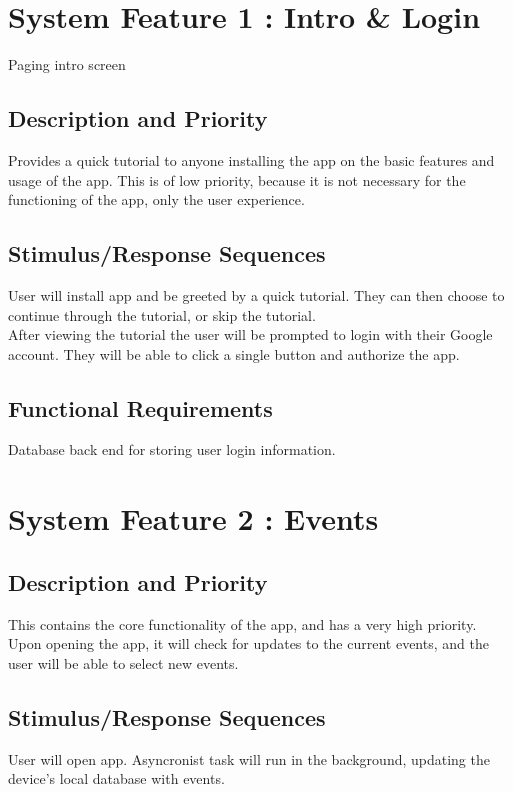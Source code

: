 \documentclass{scrreprt}
\begin{document}
\section{System Feature 1 : Intro \& Login}
Paging intro screen

\subsection{Description and Priority}
Provides a quick tutorial to anyone installing the app on the basic features and 
usage of the app. This is of low priority, because it is not necessary for the functioning 
of the app, only the user experience.

\subsection{Stimulus/Response Sequences}
User will install app and be greeted by a quick tutorial. They can then choose to 
continue through the tutorial, or skip the tutorial. \\
After viewing the tutorial the user will be prompted to login with their Google account.
They will be able to click a single button and authorize the app.

\subsection{Functional Requirements}
Database back end for storing user login information.

\section{System Feature 2 : Events}

\subsection{Description and Priority}
This contains the core functionality of the app, and has a very high priority. Upon opening 
the app, it will check for updates to the current events, and the user will be able to 
select new events.

\subsection{Stimulus/Response Sequences}
User will open app. Asyncronist task will run in the background, updating the device's
local database with events.
\end{document}
